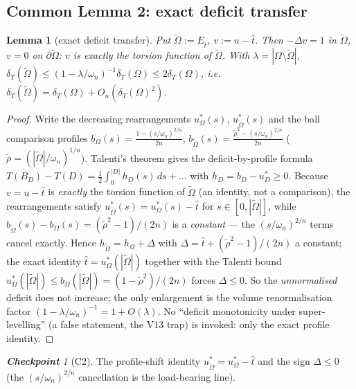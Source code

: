 \documentclass[11pt]{amsart}
\newtheorem{lemma}[theorem]{Lemma}
\theoremstyle{definition}
\theoremstyle{remark}
\newtheorem*{checkpoint}{\textbf{Checkpoint}}
\newcommand{\Om}{\Omega}
\newcommand{\Ot}{\widetilde\Omega}
\newcommand{\Et}{E_{\hat t}}
\newcommand{\dT}{\delta_T}
\begin{document}
\subsection{Common Lemma 2: exact deficit transfer}
\begin{lemma}[exact deficit transfer]\label{lem:step3}
Put $\Ot:=\Et$, $v:=u-\hat t$. Then $-\Delta v=1$ in $\Ot$, $v=0$ on
$\partial\Ot$: $v$ is \emph{exactly} the torsion function of $\Ot$. With
$\lambda=|\Om\setminus\Ot|$,
$\dT(\Ot)\le(1-\lambda/\omega_n)^{-1}\dT(\Om)\le2\dT(\Om)$, i.e.\
$\dT(\Ot)=\dT(\Om)+O_n(\dT(\Om)^2)$.
\end{lemma}
\begin{proof}
Write the decreasing rearrangements $u^*_\Om(s)$, $u^*_{\Ot}(s)$ and the ball
comparison profiles $b_\Om(s)=\tfrac{1-(s/\omega_n)^{2/n}}{2n}$,
$b_{\Ot}(s)=\tfrac{\tilde\rho^2-(s/\omega_n)^{2/n}}{2n}$
($\tilde\rho=(|\Ot|/\omega_n)^{1/n}$). Talenti's theorem gives the
deficit-by-profile formula $T(B_D)-T(D)=\tfrac12\int_0^{|D|}h_D(s)\,ds+\dots$
with $h_D=b_D-u^*_D\ge0$. Because $v=u-\hat t$ is \emph{exactly} the torsion
function of $\Ot$ (an identity, not a comparison), the rearrangements satisfy
$u^*_{\Ot}(s)=u^*_\Om(s)-\hat t$ for $s\in[0,|\Ot|]$, while
$b_{\Ot}(s)-b_\Om(s)=(\tilde\rho^2-1)/(2n)$ is a \emph{constant} --- the
$(s/\omega_n)^{2/n}$ terms cancel exactly. Hence $h_{\Ot}=h_\Om+\Delta$ with
$\Delta=\hat t+(\tilde\rho^2-1)/(2n)$ a constant; the exact identity
$\hat t=u^*_\Om(|\Ot|)$ together with the Talenti bound
$u^*_\Om(|\Ot|)\le b_\Om(|\Ot|)=(1-\tilde\rho^2)/(2n)$ forces $\Delta\le0$. So
the \emph{unnormalised} deficit does not increase; the only enlargement is the
volume renormalisation factor $(1-\lambda/\omega_n)^{-1}=1+O(\lambda)$. No
``deficit monotonicity under super-levelling'' (a false statement, the V13
trap) is invoked: only the exact profile identity.
\end{proof}
\begin{checkpoint}[C2]
The profile-shift identity $u^*_{\Ot}=u^*_\Om-\hat t$ and the sign
$\Delta\le0$ (the $(s/\omega_n)^{2/n}$ cancellation is the load-bearing line).
\end{checkpoint}
\end{document}
